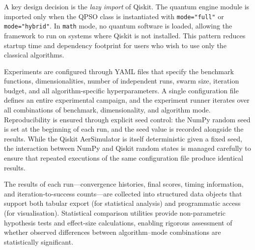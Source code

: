 A key design decision is the \emph{lazy import} of Qiskit.  The quantum engine
module is imported only when the QPSO class is instantiated with
\texttt{mode="full"} or \texttt{mode="hybrid"}.  In \texttt{math} mode, no
quantum software is loaded, allowing the framework to run on systems where
Qiskit is not installed.  This pattern reduces startup time and dependency
footprint for users who wish to use only the classical algorithms.

Experiments are configured through YAML files that specify the benchmark
functions, dimensionalities, number of independent runs, swarm size, iteration
budget, and all algorithm-specific hyperparameters.  A single configuration
file defines an entire experimental campaign, and the experiment runner
iterates over all combinations of benchmark, dimensionality, and algorithm
mode.  Reproducibility is ensured through explicit seed control: the NumPy
random seed is set at the beginning of each run, and the seed value is recorded
alongside the results.  While the Qiskit AerSimulator is itself deterministic
given a fixed seed, the interaction between NumPy and Qiskit random states is
managed carefully to ensure that repeated executions of the same configuration
file produce identical results.

The results of each run---convergence histories, final scores, timing
information, and iteration-to-success counts---are collected into structured
data objects that support both tabular export (for statistical analysis) and
programmatic access (for visualisation).  Statistical comparison utilities
provide non-parametric hypothesis tests and effect-size calculations, enabling
rigorous assessment of whether observed differences between algorithm--mode
combinations are statistically significant.
